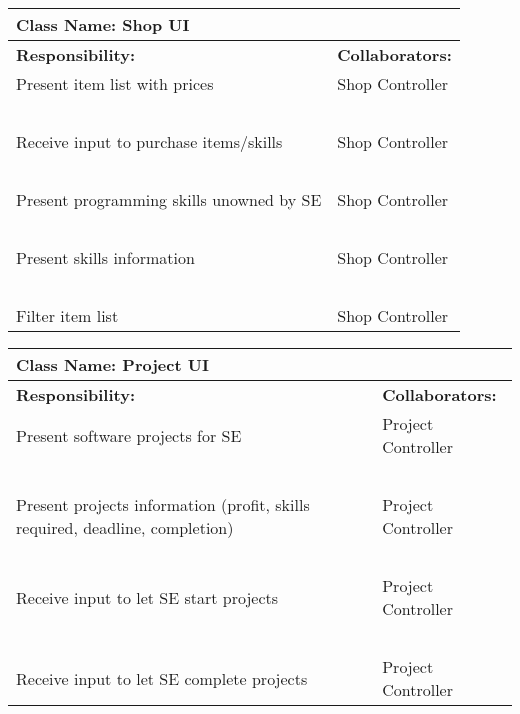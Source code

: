 \documentclass[]{article}
\begin{document}
\begin{table}[H]
    \centering
    \begin{tabular}{|p{5cm}|p{5cm}|}
        \hline
        \multicolumn{2}{|l|}{\textbf{Class Name:} Shop UI}\\
        \hline
        \textbf{Responsibility:} & \textbf{Collaborators:}\\
        \hline
        Present item list with prices & Shop Controller\\
        ~ & ~\\
        Receive input to purchase items/skills & Shop Controller\\
        ~ & ~\\
        Present programming skills unowned by SE & Shop Controller\\
        ~ & ~\\
        Present skills information & Shop Controller\\
        ~ & ~\\
        Filter item list & Shop Controller\\
        \hline
    \end{tabular}
\end{table}

\begin{table}[H]
    \centering
    \begin{tabular}{|p{5cm}|p{5cm}|}
        \hline
        \multicolumn{2}{|l|}{\textbf{Class Name:} Project UI}\\
        \hline
        \textbf{Responsibility:} & \textbf{Collaborators:}\\
        \hline
        Present software projects for SE & Project Controller\\
        ~ & ~\\
        Present projects information (profit, skills required, deadline, completion) & Project Controller\\
        ~ & ~\\
        Receive input to let SE start projects & Project Controller\\
        ~ & ~\\
        Receive input to let SE complete projects & Project Controller\\
        \hline
    \end{tabular}
\end{table}
\end{document}
